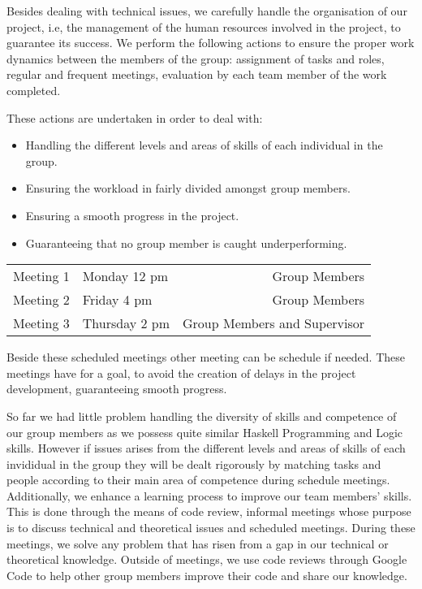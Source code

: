 Besides dealing with technical issues, we carefully handle the organisation of our project, i.e, the management of the human resources involved in the project, to guarantee its success. We perform the following actions to ensure the proper work dynamics between the members of the group: assignment of tasks and roles, regular and frequent meetings, evaluation by each team member of the work completed.

These actions are undertaken in order to deal with:

\begin{itemize}
\item Handling the different levels and areas of skills of each individual in the group.
\item Ensuring the workload in fairly divided amongst group members.
\item Ensuring a smooth progress in the project.
\item Guaranteeing that no group member is caught underperforming.
\end{itemize}

\begin{table}
\begin{tabular}{| c | l |  r |}
Meeting 1 & Monday 12 pm & Group Members \\
Meeting 2 & Friday 4 pm & Group Members \\
Meeting 3 & Thursday 2 pm & Group Members and Supervisor 
\end{tabular}
\end{table}

Beside these scheduled meetings other meeting can be schedule if needed. These meetings have for a goal, to avoid the creation of delays in the project development, guaranteeing smooth progress.

So far we had little problem handling the diversity of skills and competence of our group members as we possess quite similar Haskell Programming and Logic skills. However if issues arises from the different levels and areas of skills of each invididual in the group they will be dealt rigorously by matching tasks and people according to their main area of competence during schedule meetings. Additionally, we enhance a learning process to improve our team members' skills. This is done through the means of code review, informal meetings whose purpose is to discuss technical and theoretical issues and scheduled meetings. During these meetings, we solve any problem that has risen from a gap in our technical or theoretical knowledge. Outside of meetings, we use code reviews through Google Code to help other group members improve their code and share our knowledge. 

